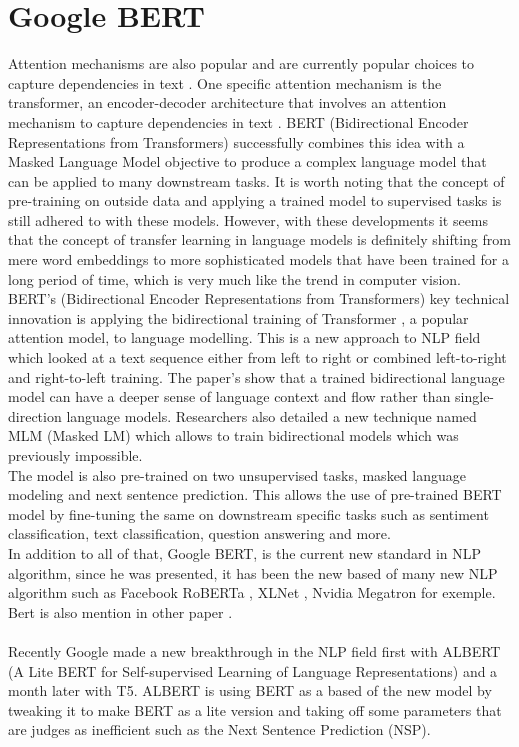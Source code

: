 \section{Google BERT}
Attention mechanisms are also popular and are currently popular choices to capture dependencies in text \cite{Lin2017, Openai}. One specific attention mechanism is the transformer, an encoder-decoder architecture that involves an attention mechanism to capture dependencies in text \cite{Vaswani2017}. BERT (Bidirectional Encoder Representations from Transformers) \cite{Devlin2018} successfully combines this idea with a Masked Language Model objective to produce a complex language model that can be applied to many downstream tasks. It is worth noting that the concept of pre-training on outside data and applying a trained model to supervised tasks is still adhered to with these models. However, with these developments it seems that the concept of transfer learning in language models is definitely shifting from mere word embeddings to more sophisticated models that have been trained for a long period of time, which is very much like the trend in computer vision.\\
BERT’s \cite{Devlin2018} (Bidirectional Encoder Representations from Transformers) key technical innovation is applying the bidirectional training of Transformer \cite{Vaswani2017}, a popular attention model, to language modelling. This is a new approach to NLP field which looked at a text sequence either from left to right or combined left-to-right and right-to-left training. The paper’s show that a trained bidirectional language model can have a deeper sense of language context and flow rather than single-direction language models. Researchers also detailed a new technique named MLM (Masked LM) which allows to train bidirectional models which was previously impossible. \\
The model is also pre-trained on two unsupervised tasks, masked language modeling and next sentence prediction. This allows the use of pre-trained BERT model by fine-tuning the same on downstream specific tasks such as sentiment classification, text classification, question answering and more.
\\
In addition to all of that, Google BERT, is the current new standard in NLP algorithm, since he was presented, it has been the new based of many new NLP algorithm such as Facebook RoBERTa \cite{Liu2019d}, XLNet \cite{Yang2019}, Nvidia Megatron \cite{Shoeybi} for exemple. Bert is also mention in other paper \cite{Zhu2019, Wang2019c}. \\ 
\\
Recently Google made a new breakthrough in the NLP field first with ALBERT (A Lite BERT for Self-supervised Learning of Language Representations) \cite{Lan} and a month later with T5\cite{Raffel2019}. ALBERT is using BERT as a based of the new model by tweaking it to make BERT as a lite version and taking off some parameters that are judges as inefficient such as the Next Sentence Prediction (NSP).

